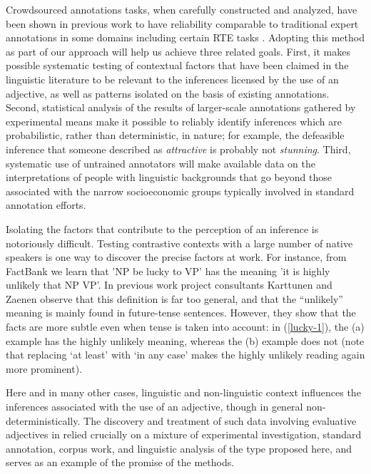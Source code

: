 \documentclass[10pt]{article}
\begin{document}
Crowdsourced annotations tasks, when carefully constructed and analyzed, have been shown in previous work to have reliability comparable to traditional expert annotations in some domains including certain RTE tasks \cite{snow:08,munroetal2010}. Adopting this method as part of our approach will help us achieve three related goals. First, it makes possible systematic testing of contextual factors that have been claimed in the linguistic literature to be relevant to the inferences licensed by the use of an adjective, as well as patterns isolated on the basis of existing annotations. Second, statistical analysis of the results of larger-scale annotations gathered by experimental means make it possible to reliably identify inferences which are probabilistic, rather than deterministic, in nature; for example, the defeasible inference that someone described as \emph{attractive} is probably not \emph{stunning}. Third, systematic use of untrained annotators will make available data on the interpretations of people with linguistic backgrounds that go beyond those associated with the narrow socioeconomic groups typically involved in standard annotation efforts. 

Isolating the factors that contribute to the perception of an inference is notoriously difficult. Testing contrastive contexts with a large number of native speakers is one way to discover the precise factors at work. For instance, from FactBank we learn that 'NP be lucky to VP' has the meaning 'it is highly unlikely that NP VP'. In previous work project consultants Karttunen and Zaenen \cite{karttunen:2012b,zaenen+karttunen:2013} observe that this definition is far too general, and that the ``unlikely'' meaning is mainly found in future-tense sentences. However, they show that the facts are more subtle even when tense is taken into account: in (\ref{lucky-1}), the (a) example has the highly unlikely meaning, whereas the (b) example does not (note that replacing `at least' with `in any case' makes the highly unlikely reading again more prominent).
 \vspace{-.1in}

\vspace{-.1in}
Here and in many other cases, linguistic and non-linguistic context influences the inferences associated with the use of an adjective, though in general non-deterministically. The discovery and treatment of such data involving evaluative adjectives in \cite{karttunen:2012b,zaenen+karttunen:2013,csli-gang-cssp13} relied crucially on a mixture of experimental investigation, standard annotation, corpus work, and linguistic analysis of the type proposed here, and serves as an example of the promise of the methods. 
\end{document}
